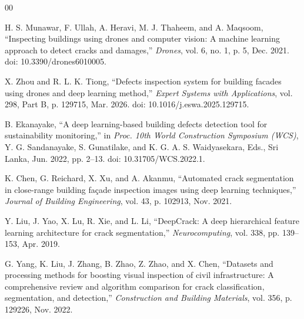 \documentclass[conference]{IEEEtran}
\begin{document}
\begin{thebibliography}{00}

H. S. Munawar, F. Ullah, A. Heravi, M. J. Thaheem, and A. Maqsoom, 
“Inspecting buildings using drones and computer vision: A machine learning approach to detect cracks and damages,” 
\textit{Drones}, vol. 6, no. 1, p. 5, Dec. 2021. doi: 10.3390/drones6010005.

X. Zhou and R. L. K. Tiong, 
“Defects inspection system for building facades using drones and deep learning method,” 
\textit{Expert Systems with Applications}, vol. 298, Part B, p. 129715, Mar. 2026. 
doi: 10.1016/j.eswa.2025.129715.

B. Ekanayake, 
“A deep learning-based building defects detection tool for sustainability monitoring,” 
in \textit{Proc. 10th World Construction Symposium (WCS)}, Y. G. Sandanayake, S. Gunatilake, and K. G. A. S. Waidyasekara, Eds., Sri Lanka, Jun. 2022, pp. 2–13. 
doi: 10.31705/WCS.2022.1.

K. Chen, G. Reichard, X. Xu, and A. Akanmu, 
“Automated crack segmentation in close-range building façade inspection images using deep learning techniques,” 
\textit{Journal of Building Engineering}, vol. 43, p. 102913, Nov. 2021.

Y. Liu, J. Yao, X. Lu, R. Xie, and L. Li, 
“DeepCrack: A deep hierarchical feature learning architecture for crack segmentation,” 
\textit{Neurocomputing}, vol. 338, pp. 139–153, Apr. 2019.

G. Yang, K. Liu, J. Zhang, B. Zhao, Z. Zhao, and X. Chen, 
“Datasets and processing methods for boosting visual inspection of civil infrastructure: A comprehensive review and algorithm comparison for crack classification, segmentation, and detection,” 
\textit{Construction and Building Materials}, vol. 356, p. 129226, Nov. 2022.

\end{thebibliography}
\end{document}
